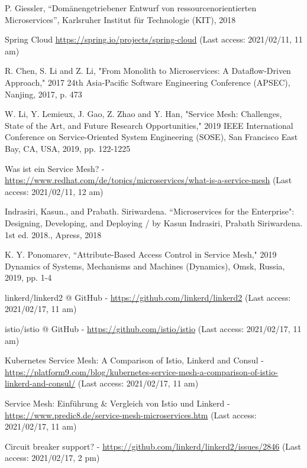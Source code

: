 \begin{thebibliography}{00}

 P. Giessler, ``Dom\"anengetriebener Entwurf von ressourcenorientierten Microservices'', Karlsruher Institut für Technologie (KIT), 2018

Spring Cloud \url{https://spring.io/projects/spring-cloud} (Last access: 2021/02/11, 11 am)

 R. Chen, S. Li and Z. Li, "From Monolith to Microservices: A Dataflow-Driven Approach," 2017 24th Asia-Pacific Software Engineering Conference (APSEC), Nanjing, 2017, p. 473

 W. Li, Y. Lemieux, J. Gao, Z. Zhao and Y. Han, "Service Mesh: Challenges, State of the Art, and Future Research Opportunities," 2019 IEEE International Conference on Service-Oriented System Engineering (SOSE), San Francisco East Bay, CA, USA, 2019, pp. 122-1225

 Was ist ein Service Mesh? - \url{https://www.redhat.com/de/topics/microservices/what-is-a-service-mesh} (Last access: 2021/02/11, 12 am)

 Indrasiri, Kasun., and Prabath. Siriwardena. ``Microservices for the Enterprise": Designing, Developing, and Deploying / by Kasun Indrasiri, Prabath Siriwardena. 1st ed. 2018., Apress, 2018

K. Y. Ponomarev, ``Attribute-Based Access Control in Service Mesh," 2019 Dynamics of Systems, Mechanisms and Machines (Dynamics), Omsk, Russia, 2019, pp. 1-4

 linkerd/linkerd2 @ GitHub - \url{https://github.com/linkerd/linkerd2} (Last access: 2021/02/17, 11 am)

 istio/istio @ GitHub - \url{https://github.com/istio/istio} (Last access: 2021/02/17, 11 am)

 Kubernetes Service Mesh: A Comparison of Istio, Linkerd and Consul - \url{https://platform9.com/blog/kubernetes-service-mesh-a-comparison-of-istio-linkerd-and-consul/} (Last access: 2021/02/17, 11 am)

 Service Mesh: Einführung \& Vergleich von Istio und Linkerd - \url{https://www.predic8.de/service-mesh-microservices.htm}  (Last access: 2021/02/17, 11 am)

 Circuit breaker support? - \url{https://github.com/linkerd/linkerd2/issues/2846} (Last access: 2021/02/17, 2 pm)


\end{thebibliography}
